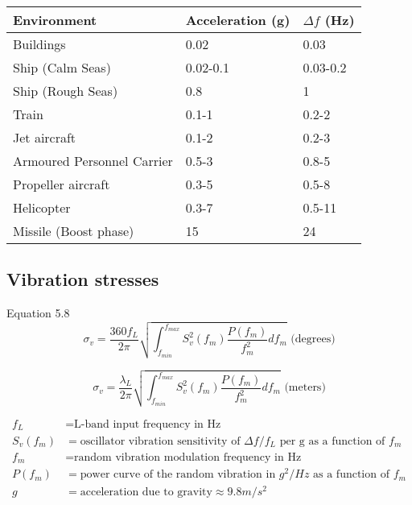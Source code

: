\begin{table}[!htb]
\centering
\begin{tabular}{|l|l|l|}
\hline
\rowcolor[HTML]{C0C0C0} 
Environment                 & Acceleration (g) & $\Delta f$ (Hz) \\ \hline
Buildings                  & 0.02        &    0.03\\ \hline
\rowcolor[HTML]{EFEFEF} 
Ship (Calm Seas)           & 0.02-0.1    &  0.03-0.2     \\ \hline
Ship (Rough Seas)          & 0.8    &     1          \\ \hline
\rowcolor[HTML]{EFEFEF} 
Train                      & 0.1-1        & 0.2-2              \\ \hline
Jet aircraft               & 0.1-2        & 0.2-3              \\ \hline
\rowcolor[HTML]{EFEFEF} 
Armoured Personnel Carrier & 0.5-3         &  0.8-5             \\ \hline
Propeller aircraft         & 0.3-5         & 0.5-8             \\ \hline
\rowcolor[HTML]{EFEFEF} 
Helicopter                 & 0.3-7         & 0.5-11              \\ \hline
Missile (Boost phase)      & 15          &  24             \\ \hline
\end{tabular}
\caption{\cite{CrystalVibration}}
\label{VibrationLevelsTable}
\end{table}

\subsection{Vibration stresses}
Equation 5.8
\begin{equation}
\sigma_v = \frac{360f_L}{2\pi}\sqrt{\int_{f_{min}}^{f_{max}} S^2_v(f_m) \frac{P(f_m)}{f^2_m} df_m}\text{ (degrees)}
\end{equation}

\begin{equation}
\sigma_v = \frac{\lambda_L}{2\pi}\sqrt{\int_{f_{min}}^{f_{max}} S^2_v(f_m) \frac{P(f_m)}{f^2_m} df_m}\text{ (meters)}
\end{equation}

\begin{align*}
f_L &= \text{L-band input frequency in Hz} \\
S_v(f_m) &= \text{oscillator vibration sensitivity of } \Delta f/f_L \text{ per g as a function of } f_m \\
f_m &= \text{random vibration modulation frequency in Hz} \\
P(f_m) &= \text{power curve of the random vibration in }g^2/Hz \text{ as a function of } f_m \\
g &= \text{acceleration due to gravity} \approx 9.8 m/s^2
\end{align*}



